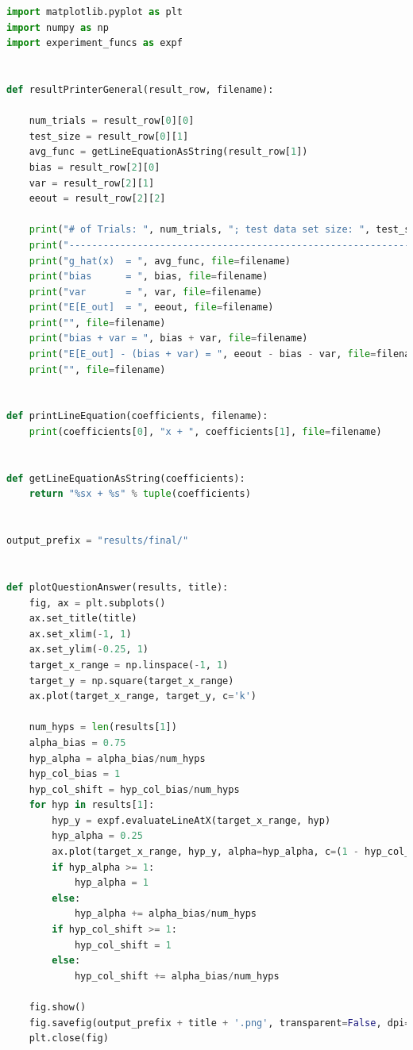 \documentclass[12pt]{article}
\begin{document}
\begin{lstlisting}[language=Python, caption=experiment\_printer.py]
import matplotlib.pyplot as plt
import numpy as np
import experiment_funcs as expf


def resultPrinterGeneral(result_row, filename):

    num_trials = result_row[0][0]
    test_size = result_row[0][1]
    avg_func = getLineEquationAsString(result_row[1])
    bias = result_row[2][0]
    var = result_row[2][1]
    eeout = result_row[2][2]

    print("# of Trials: ", num_trials, "; test data set size: ", test_size, file=filename)
    print("-------------------------------------------------------------", file=filename)
    print("g_hat(x)  = ", avg_func, file=filename)
    print("bias      = ", bias, file=filename)
    print("var       = ", var, file=filename)
    print("E[E_out]  = ", eeout, file=filename)
    print("", file=filename)
    print("bias + var = ", bias + var, file=filename)
    print("E[E_out] - (bias + var) = ", eeout - bias - var, file=filename)
    print("", file=filename)


def printLineEquation(coefficients, filename):
    print(coefficients[0], "x + ", coefficients[1], file=filename)


def getLineEquationAsString(coefficients):
    return "%sx + %s" % tuple(coefficients)


output_prefix = "results/final/"


def plotQuestionAnswer(results, title):
    fig, ax = plt.subplots()
    ax.set_title(title)
    ax.set_xlim(-1, 1)
    ax.set_ylim(-0.25, 1)
    target_x_range = np.linspace(-1, 1)
    target_y = np.square(target_x_range)
    ax.plot(target_x_range, target_y, c='k')

    num_hyps = len(results[1])
    alpha_bias = 0.75
    hyp_alpha = alpha_bias/num_hyps
    hyp_col_bias = 1
    hyp_col_shift = hyp_col_bias/num_hyps
    for hyp in results[1]:
        hyp_y = expf.evaluateLineAtX(target_x_range, hyp)
        hyp_alpha = 0.25
        ax.plot(target_x_range, hyp_y, alpha=hyp_alpha, c=(1 - hyp_col_shift, 0, hyp_col_shift))
        if hyp_alpha >= 1:
            hyp_alpha = 1
        else:
            hyp_alpha += alpha_bias/num_hyps
        if hyp_col_shift >= 1:
            hyp_col_shift = 1
        else:
            hyp_col_shift += alpha_bias/num_hyps

    fig.show()
    fig.savefig(output_prefix + title + '.png', transparent=False, dpi=80, bbox_inches="tight")
    plt.close(fig)



\end{lstlisting}
\end{document}
